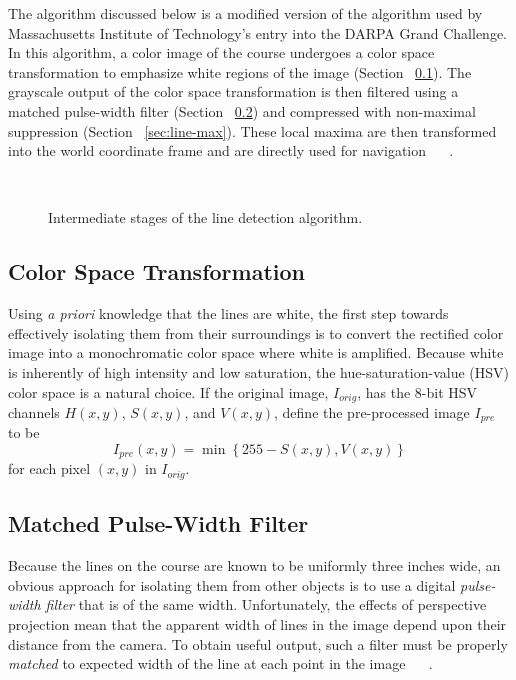 \documentclass[twocolumn,11pt]{article}
\begin{document}
The algorithm discussed below is a modified version of the algorithm used by
Massachusetts Institute of Technology's entry into the DARPA Grand Challenge.
In this algorithm, a color image of the course undergoes a color space
transformation to emphasize white regions of the image (Section
~\ref{sec:line-color}). The grayscale output of the color space transformation
is then filtered using a matched pulse-width filter (Section
~\ref{sec:line-filter}) and compressed with non-maximal suppression (Section
~\ref{sec:line-max}). These local maxima are then transformed into the world
coordinate frame and are directly used for navigation ~\cite{huang_thesis}
~\cite{huang_paper}.

\begin{figure*}[t]
	\centering
	\\
	\caption{Intermediate stages of the line detection algorithm.}
	\label{fig:line-all}
\end{figure*}

\subsection{Color Space Transformation}
\label{sec:line-color}
Using \textit{a priori} knowledge that the lines are white, the first step
towards effectively isolating them from their surroundings is to convert the
rectified color image into a monochromatic color space where white is
amplified. Because white is inherently of high intensity and low saturation,
the hue-saturation-value (HSV) color space is a natural choice. If the original
image, $I_{orig}$, has the 8-bit HSV channels $H(x,y)$, $S(x, y)$, and $V(x,
y)$, define the pre-processed image $I_{pre}$ to be
\begin{equation*}
	I_{pre}(x, y) = \min\left\{255 - S(x, y), V(x, y)\right\}
\end{equation*}
for each pixel $(x, y)$ in $I_{orig}$.

\subsection{Matched Pulse-Width Filter}
\label{sec:line-filter}
Because the lines on the course are known to be uniformly three inches wide, an
obvious approach for isolating them from other objects is to use a digital
\textit{pulse-width filter} that is of the same width. Unfortunately, the
effects of perspective projection mean that the apparent width of lines in the
image depend upon their distance from the camera. To obtain useful output, such
a filter must be properly \textit{matched} to expected width of the line at
each point in the image ~\cite{huang_thesis} ~\cite{huang_paper}.
\end{document}
